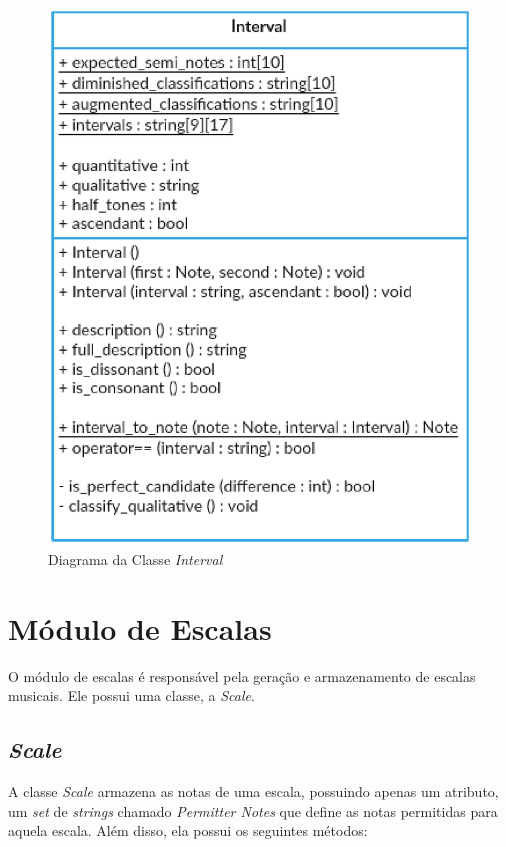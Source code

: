       \begin{figure}[htb]
        \centering
        \includegraphics[scale=0.7]{figuras/intervalclass.eps}
        \caption{Diagrama da Classe \textit{Interval}}
        \label{intervalclass}
      \end{figure}

  \section[Módulo de Escalas]{Módulo de Escalas}

    O módulo de escalas é responsável pela geração e armazenamento de escalas musicais. Ele possui uma classe, a \textit{Scale}.

    \subsection[\textit{Scale}]{\textit{Scale}}

    A classe \textit{Scale} armazena as notas de uma escala, possuindo apenas um atributo, um \textit{set} de \textit{strings} chamado \textit{Permitter Notes} que define as notas permitidas para aquela escala. Além disso, ela possui os seguintes métodos:

